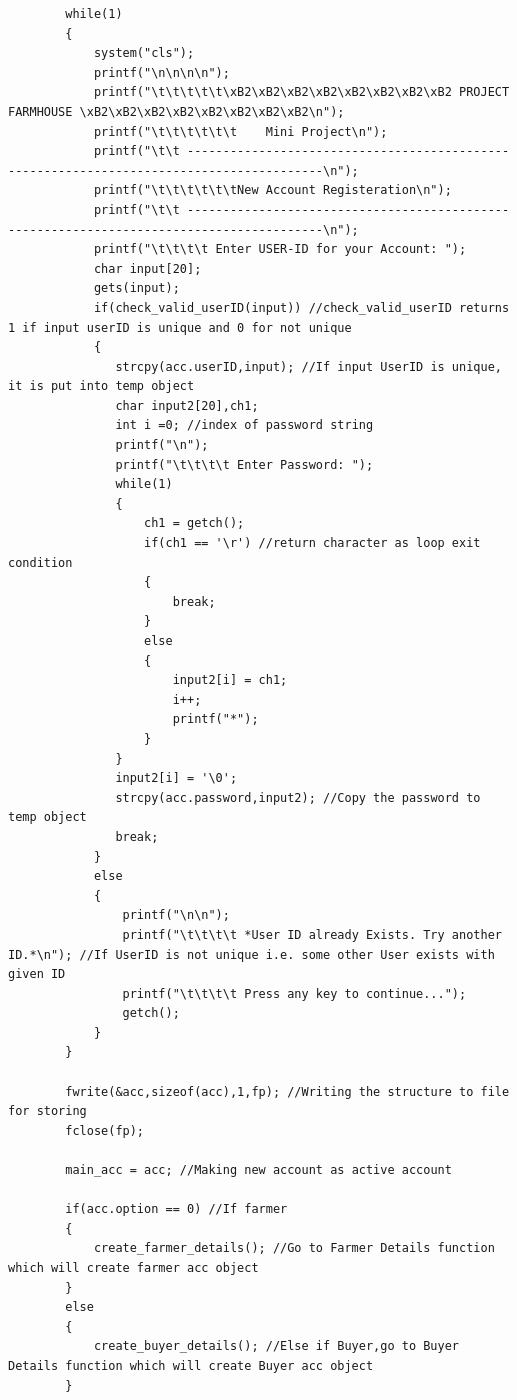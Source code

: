 \documentclass[12pt]{article}
\begin{document}
\begin{lstlisting}
        while(1)
        {
            system("cls");
            printf("\n\n\n\n");
            printf("\t\t\t\t\t\xB2\xB2\xB2\xB2\xB2\xB2\xB2\xB2 PROJECT FARMHOUSE \xB2\xB2\xB2\xB2\xB2\xB2\xB2\xB2\n");
            printf("\t\t\t\t\t\t    Mini Project\n");
            printf("\t\t -----------------------------------------------------------------------------------------\n");
            printf("\t\t\t\t\t\tNew Account Registeration\n");
            printf("\t\t -----------------------------------------------------------------------------------------\n");
            printf("\t\t\t\t Enter USER-ID for your Account: ");
            char input[20];
            gets(input);
            if(check_valid_userID(input)) //check_valid_userID returns 1 if input userID is unique and 0 for not unique
            {
               strcpy(acc.userID,input); //If input UserID is unique, it is put into temp object
               char input2[20],ch1;
               int i =0; //index of password string
               printf("\n");
               printf("\t\t\t\t Enter Password: ");
               while(1)
               {
                   ch1 = getch();
                   if(ch1 == '\r') //return character as loop exit condition
                   {
                       break;
                   }
                   else
                   {
                       input2[i] = ch1;
                       i++;
                       printf("*");
                   }
               }
               input2[i] = '\0';
               strcpy(acc.password,input2); //Copy the password to temp object
               break;
            }
            else
            {
                printf("\n\n");
                printf("\t\t\t\t *User ID already Exists. Try another ID.*\n"); //If UserID is not unique i.e. some other User exists with given ID
                printf("\t\t\t\t Press any key to continue...");
                getch();
            }
        }

        fwrite(&acc,sizeof(acc),1,fp); //Writing the structure to file for storing
        fclose(fp);

        main_acc = acc; //Making new account as active account

        if(acc.option == 0) //If farmer
        {
            create_farmer_details(); //Go to Farmer Details function which will create farmer acc object
        }
        else
        {
            create_buyer_details(); //Else if Buyer,go to Buyer Details function which will create Buyer acc object
        }


\end{lstlisting}
\end{document}
